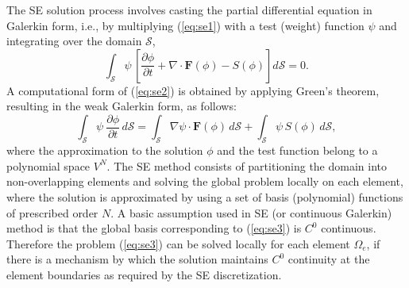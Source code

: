 \documentclass{agujournal}
\begin{document}

The  SE solution process involves  casting the partial differential equation in Galerkin form, i.e.,  by multiplying  (\ref{eq:se1})  with a test (weight) function
$\psi$  and integrating over the domain $\mathcal{S}$, 
\begin{equation}
 \int_{\mathcal{S}} \psi \,  \left[ \frac{\partial \phi }{\partial t}  + \nabla \cdot \mathbf{F}(\phi) -  S(\phi)  \right]  d\mathcal{S}  = 0. \label{eq:se2} 
 \end{equation} 
A computational form of  (\ref{eq:se2})  is obtained by applying Green's theorem,  
resulting in  the weak Galerkin form, as follows: 
 \begin{equation}
 \int_{\mathcal{S}} \psi   \ \frac{\partial \phi }{\partial t} \,   d\mathcal{S}  = 
  \int_{\mathcal{S}}  \nabla  \psi \cdot \mathbf{F}(\phi) \,  d\mathcal{S}  + 
       \int_{\mathcal{S}} \psi  \, S(\phi)  \,   d\mathcal{S}, \label{eq:se3} 
 \end{equation} 
 where the approximation to the  solution $\phi$ and the test function belong to a polynomial space  $V^{N}$. 
 The SE method consists of  partitioning the domain into non-overlapping elements and solving the global problem 
 locally on each element, where the  solution is approximated by using a set of  basis (polynomial) functions of prescribed 
 order $N$.  A basic assumption used in SE (or continuous Galerkin) method is that the global basis 
 corresponding to (\ref{eq:se3}) is 
 $C^0$ continuous. 
Therefore  the problem (\ref{eq:se3}) can be solved locally for each 
 element $\Omega_e$, if there is a mechanism by which the solution maintains $C^0$ 
 continuity at the element boundaries as required 
 by the SE  discretization.   
%
 
\end{document}
